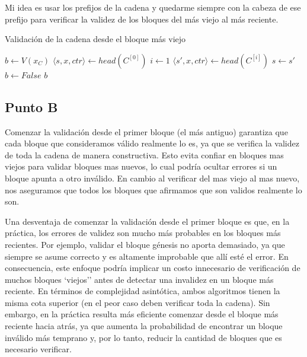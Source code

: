 \documentclass[12pt]{article}
\begin{document}
Mi idea es usar los prefijos de la cadena y quedarme siempre con la cabeza de ese prefijo para verificar la validez de los bloques del más viejo al más reciente.  

\begin{algorithm}[H]
\caption{Validación de la cadena desde el bloque más viejo}
\begin{algorithmic}[1]
    \State $b \gets V(x_C)$ 
        \State $\langle s, x, ctr \rangle \gets head(C^{[0]})$ 
         
            \State $i \gets 1$ 
            \Repeat {}
                \State $\langle s', x, ctr \rangle \gets head(C^{[i]})$ 
                 
                    \State $s \gets s'$ 
                \Else
                    \State $b \gets False$
                \EndIf
        \EndIf
    \EndIf
    \State \Return $b$
\EndFunction
\end{algorithmic}
\end{algorithm}

\subsection*{Punto B}

Comenzar la validación desde el primer bloque (el más antiguo) garantiza que cada bloque que consideramos válido realmente lo es, ya que se verifica la validez de toda la cadena de manera constructiva. Esto evita confiar en bloques mas viejos para validar bloques mas nuevos, lo cual podría ocultar errores si un bloque apunta a otro inválido. En cambio al verificar del mas viejo al mas nuevo, nos aseguramos que todos los bloques que afirmamos que son validos realmente lo son.

Una desventaja de comenzar la validación desde el primer bloque es que, en la práctica, los errores de validez son mucho más probables en los bloques más recientes. Por ejemplo, validar el bloque génesis no aporta demasiado, ya que siempre se asume correcto y es altamente improbable que allí esté el error. En consecuencia, este enfoque podría implicar un costo innecesario de verificación de muchos bloques `viejos'' antes de detectar una invalidez en un bloque más reciente. En términos de complejidad asintótica, ambos algoritmos tienen la misma cota superior (en el peor caso deben verificar toda la cadena). Sin embargo, en la práctica resulta más eficiente comenzar desde el bloque más reciente hacia atrás, ya que aumenta la probabilidad de encontrar un bloque inválido más temprano y, por lo tanto, reducir la cantidad de bloques que es necesario verificar.
\end{document}
